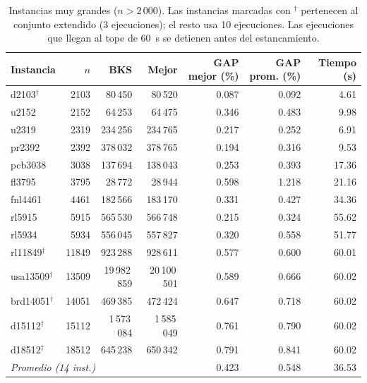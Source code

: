 \documentclass[runningheads]{llncs}
\begin{document}
\begin{table}
\caption{Instancias muy grandes ($n>2\,000$). Las instancias marcadas
con $^{\dagger}$ pertenecen al conjunto extendido (3 ejecuciones); el
resto usa 10 ejecuciones. Las ejecuciones que llegan al tope de 60~s se
detienen antes del estancamiento.}
\label{tab:vlarge}
\centering\scriptsize
\begin{tabular}{@{}lrrrrrr@{}}
\toprule
\textbf{Instancia} & $n$ & \textbf{BKS} & \textbf{Mejor} & \textbf{GAP mejor (\%)} & \textbf{GAP prom. (\%)} & \textbf{Tiempo (s)}\\
\midrule
d2103$^{\dagger}$ & 2103 & 80\,450 & 80\,520 & 0.087 & 0.092 & 4.61 \\
u2152 & 2152 & 64\,253 & 64\,475 & 0.346 & 0.483 & 9.98 \\
u2319 & 2319 & 234\,256 & 234\,765 & 0.217 & 0.252 & 6.91 \\
pr2392 & 2392 & 378\,032 & 378\,765 & 0.194 & 0.316 & 9.53 \\
pcb3038 & 3038 & 137\,694 & 138\,043 & 0.253 & 0.393 & 17.36 \\
fl3795 & 3795 & 28\,772 & 28\,944 & 0.598 & 1.218 & 21.16 \\
fnl4461 & 4461 & 182\,566 & 183\,170 & 0.331 & 0.427 & 34.36 \\
rl5915 & 5915 & 565\,530 & 566\,748 & 0.215 & 0.324 & 55.62 \\
rl5934 & 5934 & 556\,045 & 557\,827 & 0.320 & 0.558 & 51.77 \\
rl11849$^{\dagger}$ & 11849 & 923\,288 & 928\,611 & 0.577 & 0.600 & 60.01 \\
usa13509$^{\dagger}$ & 13509 & 19\,982\,859 & 20\,100\,501 & 0.589 & 0.666 & 60.02 \\
brd14051$^{\dagger}$ & 14051 & 469\,385 & 472\,424 & 0.647 & 0.718 & 60.02 \\
d15112$^{\dagger}$ & 15112 & 1\,573\,084 & 1\,585\,049 & 0.761 & 0.790 & 60.02 \\
d18512$^{\dagger}$ & 18512 & 645\,238 & 650\,342 & 0.791 & 0.841 & 60.02 \\
\midrule
\multicolumn{4}{l}{\textit{Promedio (14 inst.)}} & 0.423 & 0.548 & 36.53 \\
\bottomrule
\end{tabular}
\end{table}
\end{document}
